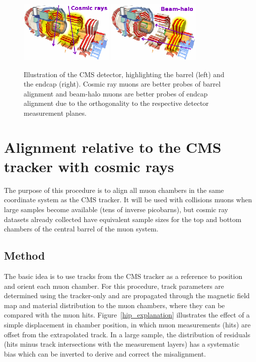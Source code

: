 \begin{figure}
\centering
\includegraphics[width=0.47\linewidth]{CMS_exploded_barrel.eps}
\includegraphics[width=0.47\linewidth]{CMS_exploded_endcap.eps}
\caption{Illustration of the CMS detector, highlighting the barrel (left) and the endcap (right).  Cosmic ray muons are better probes of barrel alignment and beam-halo muons are better probes of endcap alignment due to the orthogonality to the respective detector measurement planes.} \label{illustration}
\end{figure}

\section{Alignment relative to the CMS tracker with cosmic rays}
\label{sec:one}

The purpose of this procedure is to align all muon chambers in the
same coordinate system as the CMS tracker.  It will be used with
collisions muons when large samples become available (tens of inverse
picobarns), but cosmic ray datasets already collected have equivalent
sample sizes for the top and bottom chambers of the central barrel of
the muon system.

\subsection{Method}

The basic idea is to use tracks from the CMS tracker as a reference to
position and orient each muon chamber.  For this procedure, track
parameters are determined using the tracker-only and are propagated
through the magnetic field map and material distribution to the muon
chambers, where they can be compared with the muon hits.
Figure~\ref{hip_explanation} illustrates the effect of a simple
displacement in chamber position, in which muon measurements (hits) are
offset from the extrapolated track.  In a large sample, the
distribution of residuals (hits minus track intersections with the
measurement layers) has a systematic bias which can be inverted to
derive and correct the misalignment.

